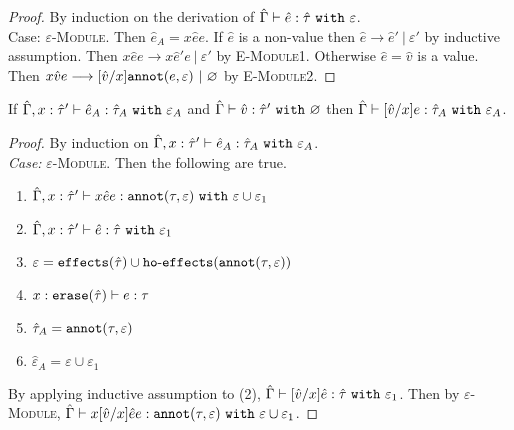 \begin{appendix}
\begin{proof} By induction on the derivation of $\hat \Gamma \vdash \hat e: \hat \tau~\mathtt{with}~ \varepsilon$.\\

Case: \textsc{$\varepsilon$-Module}. Then $\hat e_A = {x}{\hat e}{e}$. If $\hat e$ is a non-value then $\hat e \longrightarrow \hat e'~|~\varepsilon'$ by inductive assumption. Then ${x}{\hat e}{e} \longrightarrow {x}{\hat e'}{e}~|~\varepsilon'$ by \textsc{E-Module1}. Otherwise $\hat e = \hat v$ is a value. Then ${x}{\hat v}{e} \longrightarrow [\hat v/x]\mathtt{annot}(e, \varepsilon)~|~\varnothing$ by \textsc{E-Module2}.
\end{proof}


\hrulefill

\begin{lemma}[Substitution]
If $\hat \Gamma, x: \hat \tau' \vdash \hat e_A: \hat \tau_A~\mathtt{with}~ \varepsilon_A$ and $\hat \Gamma \vdash \hat v: \hat \tau'~\mathtt{with}~ \varnothing$ then $\hat \Gamma \vdash [\hat v/x]e: \hat \tau_A~\mathtt{with}~ \varepsilon_A$.
\end{lemma}

\begin{proof} By induction on $\hat \Gamma, x: \hat \tau' \vdash \hat e_A: \hat \tau_A~\mathtt{with}~ \varepsilon_A$. \\

\textit{Case:} \textsc{$\varepsilon$-Module}. Then the following are true.

\begin{enumerate}
	\setlength\itemsep{-0.7em}
	\item $\hat \Gamma, x: \hat \tau' \vdash {x}{\hat e}{e} : \mathtt{annot}(\tau, \varepsilon)~\mathtt{with}~ \varepsilon \cup \varepsilon_1$
	\item $\hat \Gamma, x: \hat \tau' \vdash \hat e: \hat \tau~\mathtt{with}~ \varepsilon_1$
	\item $\varepsilon = \mathtt{effects}(\hat \tau) \cup \mathtt{ho \hbox{-} effects}(\mathtt{annot}(\tau, \varepsilon))$
	\item $x: \mathtt{erase}(\hat \tau) \vdash e: \tau$
	\item $\hat \tau_A = \mathtt{annot}(\tau, \varepsilon)$
	\item $\hat \varepsilon_A = \varepsilon \cup \varepsilon_1$
\end{enumerate}

By applying inductive assumption to (2), $\hat \Gamma \vdash [\hat v/x]\hat e: \hat \tau~\mathtt{with}~ \varepsilon_1$.
 Then by \textsc{$\varepsilon$-Module}, $\hat \Gamma \vdash {x}{[\hat v/x]\hat e}{e}: \mathtt{annot}(\tau, \varepsilon)~\mathtt{with}~ \varepsilon \cup \varepsilon_1$.
\end{proof}


\end{appendix}
